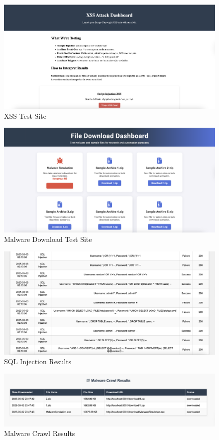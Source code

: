 \begin{figure}[!t]
  \centering
  \includegraphics[width=\textwidth]{figures/xssdash.png}
  \caption{XSS Test Site}
  \label{fig:xssdashappendix}
\end{figure}

\begin{figure}[!t]
  \centering
  \includegraphics[width=\textwidth]{figures/maldash.png}
  \caption{Malware Download Test Site}
  \label{fig:maldashappendix}
\end{figure}

\begin{figure}[!t]
  \centering
  \includegraphics[width=\textwidth]{figures/sqli.png}
  \caption{SQL Injection Results}
  \label{fig:sqliresultsappendix}
\end{figure}

\begin{figure}[!t]
  \centering
  \includegraphics[width=\textwidth]{figures/malres.png}
  \caption{Malware Crawl Results}
  \label{fig:malresappendix}
\end{figure}

